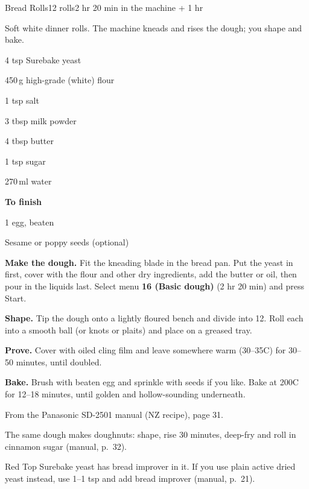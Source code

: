 \begin{recipebox}{Bread Rolls}{12 rolls}{2 hr 20 min in the machine + 1 hr}

Soft white dinner rolls. The machine kneads and rises the dough; you shape and bake.

\begin{ingredients}
  \item 4 tsp Surebake yeast
  \item 450\,g high-grade (white) flour
  \item 1 tsp salt
  \item 3 tbsp milk powder
  \item 4 tbsp butter
  \item 1 tsp sugar
  \item 270\,ml water
  \item[] \textbf{To finish}
  \item 1 egg, beaten
  \item Sesame or poppy seeds (optional)
\end{ingredients}

\begin{method}
  \item \textbf{Make the dough.} Fit the kneading blade in the bread pan. Put the yeast in first, cover with the flour and other dry ingredients, add the butter or oil, then pour in the liquids last. Select menu \textbf{16 (Basic dough)} (2 hr 20 min) and press Start.
  \item \textbf{Shape.} Tip the dough onto a lightly floured bench and divide into 12. Roll each into a smooth ball (or knots or plaits) and place on a greased tray.
  \item \textbf{Prove.} Cover with oiled cling film and leave somewhere warm (30--35\degree C) for 30--50 minutes, until doubled.
  \item \textbf{Bake.} Brush with beaten egg and sprinkle with seeds if you like. Bake at 200\degree C for 12--18 minutes, until golden and hollow-sounding underneath.
\end{method}

\begin{notelist}
  \item From the Panasonic SD-2501 manual (NZ recipe), page 31.
  \item The same dough makes doughnuts: shape, rise 30 minutes, deep-fry and roll in cinnamon sugar (manual, p.~32).
  \item Red Top Surebake yeast has bread improver in it. If you use plain active dried yeast instead, use 1--1 tsp and add bread improver (manual, p.~21).
\end{notelist}

\end{recipebox}
